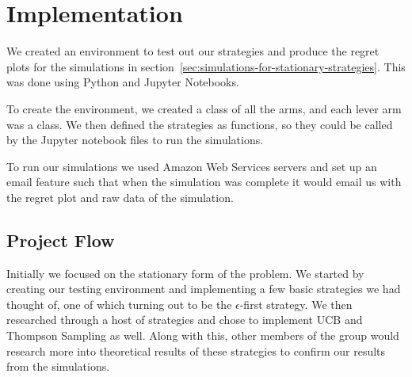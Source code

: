\section{Implementation}\label{sec:implementation}

We created an environment to test out our strategies and produce the regret plots for the simulations in section~\ref{sec:simulations-for-stationary-strategies}.
This was done using Python and Jupyter Notebooks.

To create the environment, we created a class of all the arms, and each lever arm was a class.
We then defined the strategies as functions, so they could be called by the Jupyter notebook files to run the simulations.

To run our simulations we used Amazon Web Services servers and set up an email feature such that when the simulation was complete it would email us with the regret plot and raw data of the simulation.

\subsection{Project Flow}\label{subsec:project-flow}

Initially we focused on the stationary form of the problem.
We started by creating our testing environment and implementing a few basic strategies we had thought of, one of which turning out to be the $\epsilon$-first strategy.
We then researched through a host of strategies and chose to implement UCB and Thompson Sampling as well.
Along with this, other members of the group would research more into theoretical results of these strategies to confirm our results from the simulations.
